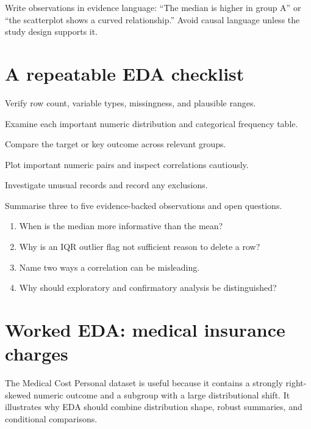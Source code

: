 \begin{keyidea}
Write observations in evidence language: ``The median is higher in group A'' or ``the scatterplot shows a curved relationship.'' Avoid causal language unless the study design supports it.
\end{keyidea}

\section{A repeatable EDA checklist}
\begin{mlsteps}
  \item Verify row count, variable types, missingness, and plausible ranges.
  \item Examine each important numeric distribution and categorical frequency table.
  \item Compare the target or key outcome across relevant groups.
  \item Plot important numeric pairs and inspect correlations cautiously.
  \item Investigate unusual records and record any exclusions.
  \item Summarise three to five evidence-backed observations and open questions.
\end{mlsteps}

\begin{quickcheck}
\begin{enumerate}
  \item When is the median more informative than the mean?
  \item Why is an IQR outlier flag not sufficient reason to delete a row?
  \item Name two ways a correlation can be misleading.
  \item Why should exploratory and confirmatory analysis be distinguished?
\end{enumerate}
\end{quickcheck}

\section{Worked EDA: medical insurance charges}

The Medical Cost Personal dataset is useful because it contains a strongly right-skewed numeric outcome and a subgroup with a large distributional shift. It illustrates why EDA should combine distribution shape, robust summaries, and conditional comparisons.

